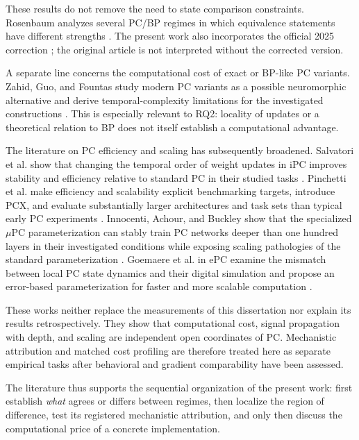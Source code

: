 These results do not remove the need to state comparison constraints. Rosenbaum
analyzes several PC/BP regimes in which equivalence statements have different strengths
\cite{rosenbaum2022relationship}. The present work also incorporates the official 2025
correction \cite{rosenbaum2025correction}; the original article is not interpreted
without the corrected version.

A separate line concerns the computational cost of exact or BP-like PC variants.
Zahid, Guo, and Fountas study modern PC variants as a possible neuromorphic alternative
and derive temporal-complexity limitations for the investigated constructions
\cite{zahid2023critical}. This is especially relevant to RQ2: locality of updates or a
theoretical relation to BP does not itself establish a computational advantage.

The literature on PC efficiency and scaling has subsequently broadened. Salvatori et
al. show that changing the temporal order of weight updates in iPC improves stability
and efficiency relative to standard PC in their studied tasks
\cite{salvatori2024stable}. Pinchetti et al. make efficiency and scalability explicit
benchmarking targets, introduce PCX, and evaluate substantially larger architectures
and task sets than typical early PC experiments \cite{pinchetti2025benchmarking}.
Innocenti, Achour, and Buckley show that the specialized $\mu$PC parameterization can
stably train PC networks deeper than one hundred layers in their investigated
conditions while exposing scaling pathologies of the standard parameterization
\cite{innocenti2025mupc}. Goemaere et al. in ePC examine the mismatch between local PC
state dynamics and their digital simulation and propose an error-based parameterization
for faster and more scalable computation \cite{goemaere2026epc}.

These works neither replace the measurements of this dissertation nor explain its
results retrospectively. They show that computational cost, signal propagation with
depth, and scaling are independent open coordinates of PC. Mechanistic attribution
and matched cost profiling are therefore treated here as separate empirical tasks
after behavioral and gradient comparability have been assessed.

The literature thus supports the sequential organization of the present work: first
establish \emph{what} agrees or differs between regimes, then localize the region of
difference, test its registered mechanistic attribution, and only then discuss the
computational price of a concrete implementation.

